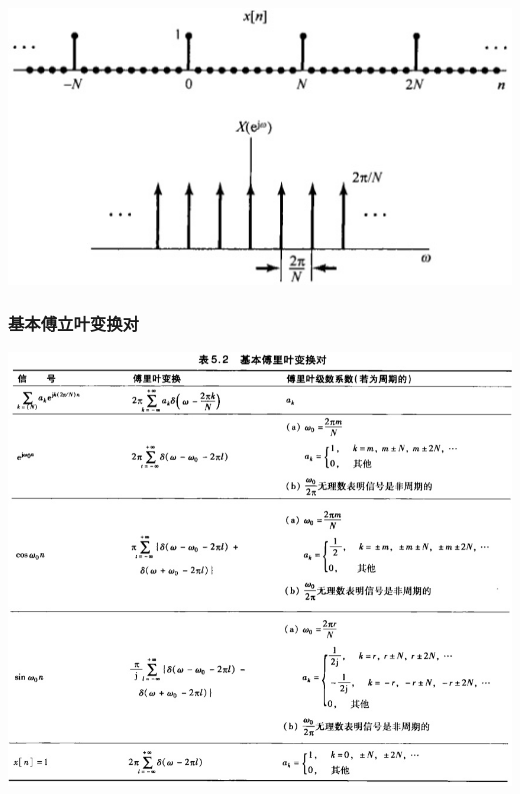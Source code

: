 \documentclass[CJKutf8,xcolor=pdftex,dvipsnames,table]{beamer}
\begin{document}
\begin{CJK*}{UTF8}{song}
\begin{frame}
\begin{itemize}
    	\begin{center}
    	\includegraphics[scale=.35]{ss-c-f5-11}
    	\end{center}
    \end{itemize}

  \end{frame}    
    
  \begin{frame}
    \frametitle{基本傅立叶变换对}
    \begin{center}
      \includegraphics[scale=.32]{ss-c-t5-2a}
    \end{center}
  \end{frame}  
   

\end{CJK*}
\end{document}
